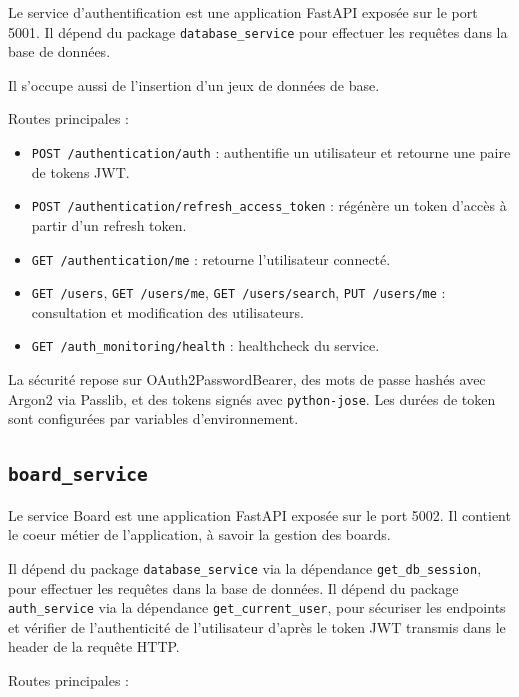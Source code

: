 \documentclass[a4paper,11pt]{article}
\begin{document}
Le service d'authentification est une application FastAPI exposée sur le port 5001. Il dépend du package \texttt{database\_service} pour effectuer les requêtes dans la base de données.

Il s'occupe aussi de l'insertion d'un jeux de données de base.

Routes principales :

\begin{itemize}[leftmargin=*]
  \item \texttt{POST /authentication/auth} : authentifie un utilisateur et retourne une paire de tokens JWT.
  \item \texttt{POST /authentication/refresh\_access\_token} : régénère un token d'accès à partir d'un refresh token.
  \item \texttt{GET /authentication/me} : retourne l'utilisateur connecté.
  \item \texttt{GET /users}, \texttt{GET /users/me}, \texttt{GET /users/search}, \texttt{PUT /users/me} : consultation et modification des utilisateurs.
  \item \texttt{GET /auth\_monitoring/health} : healthcheck du service.
\end{itemize}

La sécurité repose sur OAuth2PasswordBearer, des mots de passe hashés avec Argon2 via Passlib, et des tokens signés avec \texttt{python-jose}. Les durées de token sont configurées par variables d'environnement.

\subsection{\texorpdfstring{\texttt{board\_service}}{board service}}

Le service Board est une application FastAPI exposée sur le port 5002. Il contient le coeur métier de l'application, à savoir la gestion des boards.

Il dépend du package \texttt{database\_service} via la dépendance \texttt{get\_db\_session}, pour effectuer les requêtes dans la base de données.
Il dépend du package \texttt{auth\_service} via la dépendance \texttt{get\_current\_user}, pour sécuriser les endpoints et vérifier de l'authenticité de l'utilisateur d'après le token JWT transmis dans le header de la requête HTTP.

Routes principales :
\end{document}
